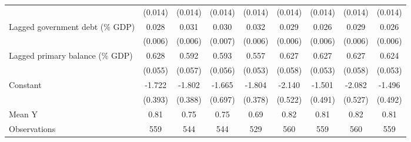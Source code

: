 {\begin{tabular}{l*{8}{c}}
                    &     (0.014)         &     (0.014)         &     (0.014)         &     (0.014)         &     (0.014)         &     (0.014)         &     (0.014)         &     (0.014)         \\
\addlinespace
Lagged government debt (\% GDP)&       0.028\sym{***}&       0.031\sym{***}&       0.030\sym{***}&       0.032\sym{***}&       0.029\sym{***}&       0.026\sym{***}&       0.029\sym{***}&       0.026\sym{***}\\
                    &     (0.006)         &     (0.006)         &     (0.007)         &     (0.006)         &     (0.006)         &     (0.006)         &     (0.006)         &     (0.006)         \\
\addlinespace
Lagged primary balance (\% GDP)&       0.628\sym{***}&       0.592\sym{***}&       0.593\sym{***}&       0.557\sym{***}&       0.627\sym{***}&       0.627\sym{***}&       0.627\sym{***}&       0.624\sym{***}\\
                    &     (0.055)         &     (0.057)         &     (0.056)         &     (0.053)         &     (0.058)         &     (0.053)         &     (0.058)         &     (0.053)         \\
\addlinespace
Constant            &      -1.722\sym{***}&      -1.802\sym{***}&      -1.665\sym{**} &      -1.804\sym{***}&      -2.140\sym{***}&      -1.501\sym{***}&      -2.082\sym{***}&      -1.496\sym{***}\\
                    &     (0.393)         &     (0.388)         &     (0.697)         &     (0.378)         &     (0.522)         &     (0.491)         &     (0.527)         &     (0.492)         \\
\midrule
Mean Y              &        0.81         &        0.75         &        0.75         &        0.69         &        0.82         &        0.81         &        0.82         &        0.81         \\
Observations        &         559         &         544         &         544         &         529         &         560         &         559         &         560         &         559         \\
\bottomrule
\end{tabular}
}
